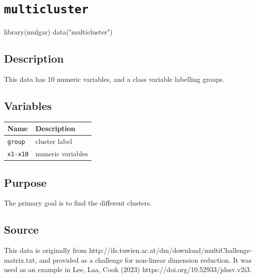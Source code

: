 \documentclass[
  letterpaper,
]{krantz}
\newenvironment{Shaded}{\begin{snugshade}}{\end{snugshade}}
\newcommand{\FunctionTok}[1]{\textcolor[rgb]{0.28,0.35,0.67}{#1}}
\newcommand{\NormalTok}[1]{\textcolor[rgb]{0.00,0.23,0.31}{#1}}
\newcommand{\StringTok}[1]{\textcolor[rgb]{0.13,0.47,0.30}{#1}}
\begin{document}
\section{\texorpdfstring{\texttt{multicluster}}{multicluster}}\label{multicluster}

\begin{Shaded}
\begin{Highlighting}[]
\FunctionTok{library}\NormalTok{(mulgar)}
\FunctionTok{data}\NormalTok{(}\StringTok{"multicluster"}\NormalTok{)}
\end{Highlighting}
\end{Shaded}

\subsection*{Description}\label{description-6}

This data has 10 numeric variables, and a class variable labelling
groups.

\subsection*{Variables}\label{variables-6}

\begin{longtable}[]{@{}ll@{}}
\toprule\noalign{}
Name & Description \\
\midrule\noalign{}
\endhead
\bottomrule\noalign{}
\endlastfoot
\texttt{group} & cluster label \\
\texttt{x1-x10} & numeric variables \\
\end{longtable}

\subsection*{Purpose}\label{purpose-6}

The primary goal is to find the different clusters.

\subsection*{Source}\label{source-6}

This data is originally from
http://ifs.tuwien.ac.at/dm/download/multiChallenge-matrix.txt, and
provided as a challenge for non-linear dimension reduction. It was used
as an example in Lee, Laa, Cook (2023)
https://doi.org/10.52933/jdssv.v2i3.
\end{document}
